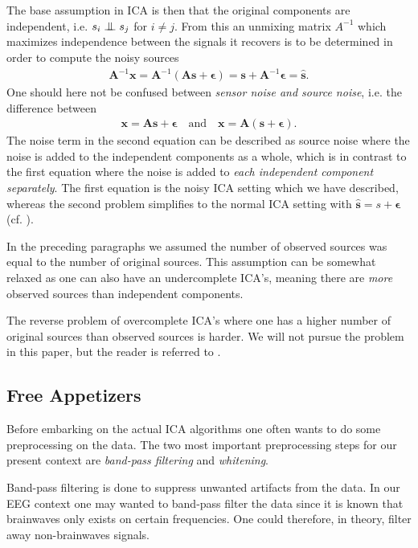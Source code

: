	The base assumption in ICA is then that the original components are independent, i.e. $s_i\indep s_j$ for $i\neq j$. From this an unmixing matrix $A^{-1}$ which maximizes independence between the signals it recovers is to be determined in order to compute the noisy sources
		\begin{align*}
			\textbf{A}^{-1}\textbf{x}=\textbf{A}^{-1}(\textbf{A}\textbf{s}+\bm{\epsilon})=\textbf{s}+\textbf{A}^{-1}\bm{\epsilon}=\hat{\textbf{s}}.
		\end{align*} 
	One should here not be confused between \textit{sensor noise and source noise}, i.e. the difference between
		\begin{align*}
			\textbf{x}=\textbf{A}\textbf{s}+\bm{\epsilon} \quad \text{and} \quad \textbf{x}=\textbf{A}(\textbf{s}+\bm{\epsilon}).
		\end{align*} 
	The noise term in the second equation can be described as source noise where the noise is added to the independent components as a whole, which is in contrast to the first equation where the noise is added to \textit{each independent component separately}. The first equation is the noisy ICA setting which we have described, whereas the second problem simplifies to the normal ICA setting with $\hat{\textbf{s}}=s+\bm{\epsilon}$ (cf. \cite[p.94]{hyvarinen2000}).

	In the preceding paragraphs we assumed the number of observed sources was equal to the number of original sources. This assumption can be somewhat relaxed as one can also have an undercomplete ICA's, meaning there are \textit{more} observed sources than independent components. 

	The reverse problem of overcomplete ICA's where one has a higher number of original sources than observed sources is harder. We will not pursue the problem in this paper, but the reader is referred to \cite[ch.16]{hyvarinen2000}.

	\subsection{Free Appetizers}

		Before embarking on the actual ICA algorithms one often wants to do some preprocessing on the data. The two most important preprocessing steps for our present context are \textit{band-pass filtering} and \textit{whitening}.

		Band-pass filtering is done to suppress unwanted artifacts from the data. In our EEG context one may wanted to band-pass filter the data since it is known that brainwaves only exists on certain frequencies. One could therefore, in theory, filter away non-brainwaves signals.
		
